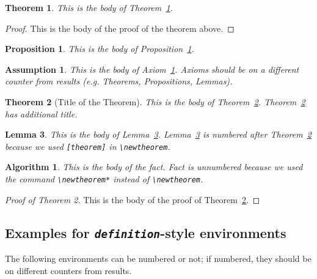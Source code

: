 \documentclass[qe,nameyear,final,openaccess]{econsocart}
\theoremstyle{plain}
\newtheorem{theorem}{Theorem}[section]
\newtheorem{lemma}[theorem]{Lemma}
\newtheorem{proposition}{Proposition}[section]
\newtheorem{axiom}{Axiom}[section]
\newtheorem{observation}{Observation}[section]
\newtheorem{axiom}[axiom]{Assumption}%
\newtheorem{observation}[observation]{Algorithm}%
\begin{document}
\begin{theorem}\label{th1}This is the body of Theorem~\ref{th1}.

\end{theorem}\begin{proof}This is the body of the proof of the theorem above.

\end{proof}\begin{proposition}\label{cl1}This is the body of Proposition~\ref{cl1}.

\end{proposition}\begin{axiom}\label{ax1}This is the body of Axiom~\ref{ax1}. Axioms should be on a different counter from results (e.g. Theorems, Propositions, Lemmas).

\end{axiom}\begin{theorem}[Title of the Theorem]\label{th2}This is the body of Theorem~\ref{th2}. Theorem~\ref{th2} has additional title.

\end{theorem}\begin{lemma}\label{le1}This is the body of Lemma~\ref{le1}. Lemma~\ref{le1} is numbered after
Theorem~\ref{th2} because we used \texttt{[theorem]} in \texttt{{\textbackslash}newtheorem}.

\end{lemma}\begin{observation}This is the body of the fact. Fact is unnumbered because we used the command \texttt{{\textbackslash}newtheorem*}
instead of \texttt{{\textbackslash}newtheorem}.

\end{observation}\begin{proof}[Proof of Theorem 2]This is the body of the proof of Theorem~\ref{th2}.

\end{proof}\subsection{Examples for \textit{\texttt{definition}}-style environments}

The following environments can be numbered or not; if numbered, they should be on different counters from results.
\end{document}
